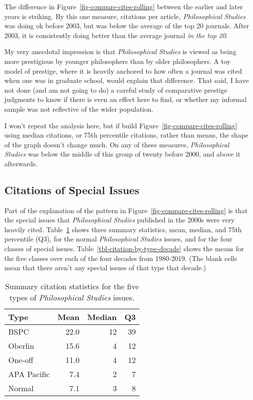 \documentclass[
  10pt,
  letterpaper,
  DIV=11,
  numbers=noendperiod,
  twoside]{scrartcl}
\begin{document}
The difference in Figure~\ref{fig-compare-cites-rolling} between the
earlier and later years is striking. By this one measure, citations per
article, \emph{Philosophical Studies} was doing ok before 2003, but was
below the average of the top 20 journals. After 2003, it is consistently
doing better than the average journal \emph{in the top 20}.

My very anecdotal impression is that \emph{Philosophical Studies} is
viewed as being more prestigious by younger philosophers than by older
philosophers. A toy model of prestige, where it is heavily anchored to
how often a journal was cited when one was in graduate school, would
explain that difference. That said, I have not done (and am not going to
do) a careful study of comparative prestige judgments to know if there
is even an effect here to find, or whether my informal sample was not
reflective of the wider population.

I won't repeat the analysis here, but if build
Figure~\ref{fig-compare-cites-rolling} using median citations, or 75th
percentile citations, rather than means, the shape of the graph doesn't
change much. On any of these measures, \emph{Philosophical Studies} was
below the middle of this group of twenty before 2000, and above it
afterwards.

\subsection{Citations of Special
Issues}\label{sec-citations-of-special-issues}

Part of the explanation of the pattern in
Figure~\ref{fig-compare-cites-rolling} is that the special issues that
\emph{Philosophical Studies} published in the 2000s were very heavily
cited. Table~\ref{tbl-citation-by-type} shows three summary statistics,
mean, median, and 75th percentile (Q3), for the normal
\emph{Philosophical Studies} issues, and for the four classes of special
issues. Table~\ref{tbl-citation-by-type-decade} shows the means for the
five classes over each of the four decades from 1980-2019. (The blank
cells mean that there aren't any special issues of that type that
decade.)

\begin{longtable}[]{@{}lrrr@{}}

\caption{\label{tbl-citation-by-type}Summary citation statistics for the
five types of \emph{Philosophical Studies} issues.}

\tabularnewline

\toprule\noalign{}
Type & Mean & Median & Q3 \\
\midrule\noalign{}
\endhead
\bottomrule\noalign{}
\endlastfoot
BSPC & 22.0 & 12 & 39 \\
Oberlin & 15.6 & 4 & 12 \\
One-off & 11.0 & 4 & 12 \\
APA Pacific & 7.4 & 2 & 7 \\
Normal & 7.1 & 3 & 8 \\

\end{longtable}
\end{document}
